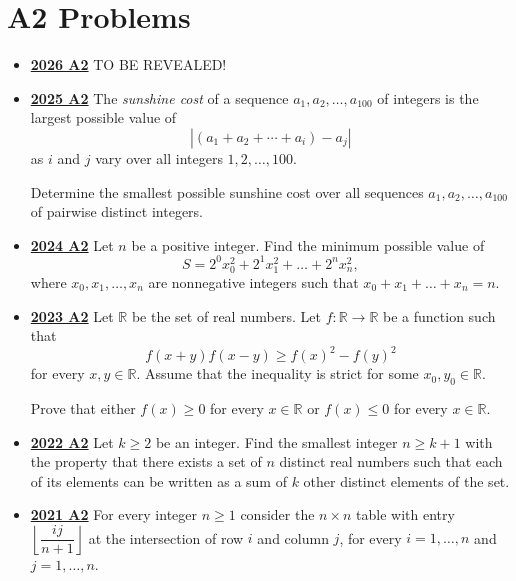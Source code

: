 \documentclass[11pt]{scrartcl}
\begin{document}
\section*{A2 Problems} \label{A2}
 \begin{itemize}[leftmargin=*]


\item \href{https://www.imo-official.org/assets/documents/problems/2026/IMO2026SL.pdf}{\textbf{2026 A2}} TO BE REVEALED!

\item \href{https://artofproblemsolving.com/community/c6h3866858p38676946}{\textbf{2025 A2}} The \textit{sunshine cost} of a sequence $a_1,a_2,\ldots,a_{100}$ of integers is the largest possible value of
\[|(a_1+a_2+\cdots+a_i)-a_j|\]as $i$ and $j$ vary over all integers $1,2,\ldots,100$.

Determine the smallest possible sunshine cost over all sequences $a_1, a_2, \ldots, a_{100}$ of pairwise distinct integers.
\item \href{https://artofproblemsolving.com/community/c6h3610446p35340919}{\textbf{2024 A2}} Let $n$ be a positive integer. Find the minimum possible value of
\[
S = 2^0 x_0^2 + 2^1 x_1^2 + \dots + 2^n x_n^2,
\]where $x_0, x_1, \dots, x_n$ are nonnegative integers such that $x_0 + x_1 + \dots + x_n = n$.
\item \href{https://artofproblemsolving.com/community/c6h3359723p31218373}{\textbf{2023 A2}} Let $\mathbb{R}$ be the set of real numbers. Let $f:\mathbb{R}\rightarrow\mathbb{R}$ be a function such that\[f(x+y)f(x-y)\geqslant  f(x)^2-f(y)^2\]for every $x,y\in\mathbb{R}$. Assume that the inequality is strict for some $x_0,y_0\in\mathbb{R}$.

Prove that either $f(x)\geqslant  0$ for every $x\in\mathbb{R}$ or $f(x)\leqslant 0$ for every $x\in\mathbb{R}$.
\item \href{https://artofproblemsolving.com/community/c6h3107342p28104303}{\textbf{2022 A2}} Let $k\geqslant 2$ be an integer. Find the smallest integer $n \geqslant k+1$ with the property that there exists a set of $n$ distinct real numbers such that each of its elements can be written as a sum of $k$ other distinct elements of the set. 
\item \href{https://artofproblemsolving.com/community/c6h2882567p25627655}{\textbf{2021 A2}} For every integer $n \geqslant 1$ consider the $n \times n$ table with entry $\left\lfloor \dfrac{ij}{n+1} \right\rfloor$ at the intersection of row $i$ and column $j$, for every $i=1,\dots,n$ and $j=1,\dots,n$. 


\end{itemize}
\end{document}
